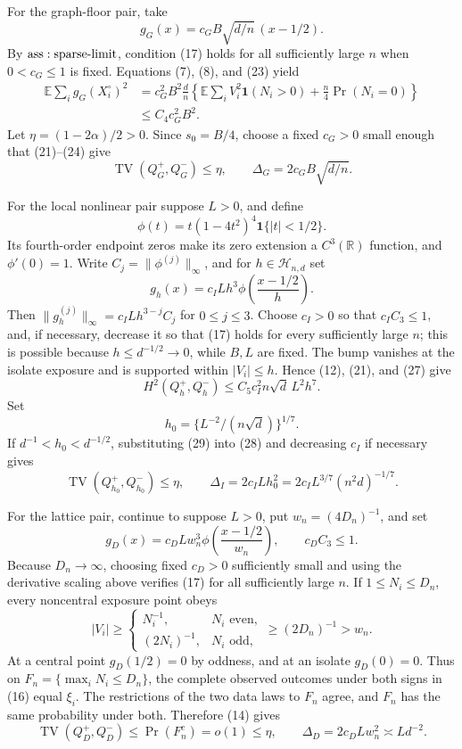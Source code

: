 For the graph-floor pair, take
\[
 g_G(x)=c_GB\sqrt{d/n}\,(x-1/2).
\tag{23}
\]
By \({\rm ass:sparse\text{-}limit}\), condition (17) holds for all sufficiently large \(n\) when \(0<c_G\leq1\) is fixed.  Equations (7), (8), and (23) yield
\[
\begin{aligned}
 \mathbb E\sum_i g_G(X_i^\circ)^2
 &=c_G^2B^2\frac dn
 \left\{\mathbb E\sum_iV_i^2\mathbf1(N_i>0)
 +\frac n4\Pr(N_i=0)\right\}\\
 &\leq C_4c_G^2B^2.
\end{aligned}
\tag{24}
\]
Let \(\eta=(1-2\alpha)/2>0\).  Since \(s_0=B/4\), choose a fixed \(c_G>0\) small enough that (21)--(24) give
\[
 \operatorname{TV}(Q_G^+,Q_G^-)\leq\eta,
 \qquad \Delta_G=2c_GB\sqrt{d/n}.
\tag{25}
\]

For the local nonlinear pair suppose \(L>0\), and define
\[
 \phi(t)=t(1-4t^2)^4\mathbf1\{|t|<1/2\}.
\tag{26}
\]
Its fourth-order endpoint zeros make its zero extension a \(C^3(\mathbb R)\) function, and \(\phi'(0)=1\).  Write \(C_j=\|\phi^{(j)}\|_\infty\), and for \(h\in\mathcal H_{n,d}\) set
\[
 g_h(x)=c_ILh^3\phi\!\left(\frac{x-1/2}{h}\right).
\tag{27}
\]
Then \(\|g_h^{(j)}\|_\infty=c_ILh^{3-j}C_j\) for \(0\leq j\leq3\).  Choose \(c_I>0\) so that \(c_IC_3\leq1\), and, if necessary, decrease it so that (17) holds for every sufficiently large \(n\); this is possible because \(h\leq d^{-1/2}\to0\), while \(B,L\) are fixed.  The bump vanishes at the isolate exposure and is supported within \(|V_i|\leq h\).  Hence (12), (21), and (27) give
\[
 H^2(Q_h^+,Q_h^-)
 \leq C_5c_I^2n\sqrt d\,L^2h^7.
\tag{28}
\]
Set
\[
 h_0=\{L^{-2}/(n\sqrt d)\}^{1/7}.
\tag{29}
\]
If \(d^{-1}<h_0<d^{-1/2}\), substituting (29) into (28) and decreasing \(c_I\) if necessary gives
\[
 \operatorname{TV}(Q_{h_0}^+,Q_{h_0}^-)\leq\eta,
 \qquad \Delta_I=2c_ILh_0^2
 =2c_IL^{3/7}(n^2d)^{-1/7}.
\tag{30}
\]

For the lattice pair, continue to suppose \(L>0\), put \(w_n=(4D_n)^{-1}\), and set
\[
 g_D(x)=c_DLw_n^3\phi\!\left(\frac{x-1/2}{w_n}\right),
 \qquad c_DC_3\leq1.
\tag{31}
\]
Because \(D_n\to\infty\), choosing fixed \(c_D>0\) sufficiently small and using the derivative scaling above verifies (17) for all sufficiently large \(n\).  If \(1\leq N_i\leq D_n\), every noncentral exposure point obeys
\[
 |V_i|\geq
 \begin{cases}
 N_i^{-1},&N_i\text{ even},\\
 (2N_i)^{-1},&N_i\text{ odd},
 \end{cases}
 \geq(2D_n)^{-1}>w_n.
\tag{32}
\]
At a central point \(g_D(1/2)=0\) by oddness, and at an isolate \(g_D(0)=0\).  Thus on \(F_n=\{\max_iN_i\leq D_n\}\), the complete observed outcomes under both signs in (16) equal \(\xi_i\).  The restrictions of the two data laws to \(F_n\) agree, and \(F_n\) has the same probability under both.  Therefore (14) gives
\[
 \operatorname{TV}(Q_D^+,Q_D^-)
 \leq\Pr(F_n^c)=o(1)\leq\eta,
 \qquad \Delta_D=2c_DLw_n^2\asymp Ld^{-2}.
\tag{33}
\]

